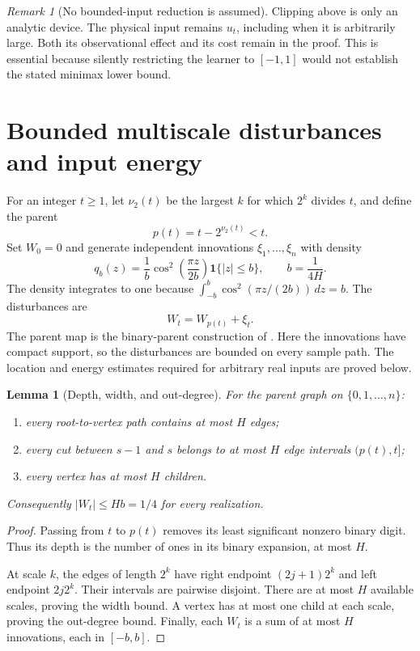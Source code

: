 \documentclass[11pt]{article}
\newtheorem{lemma}[theorem]{Lemma}
\theoremstyle{remark}
\newtheorem{remark}[theorem]{Remark}
\newcommand{\one}{\mathbf 1}
\begin{document}
\begin{remark}[No bounded-input reduction is assumed]
Clipping above is only an analytic device. The physical input remains $u_t$, including when it is arbitrarily large. Both its observational effect and its cost remain in the proof. This is essential because silently restricting the learner to $[-1,1]$ would not establish the stated minimax lower bound.
\end{remark}

\section{Bounded multiscale disturbances and input energy}\label{sec:noise}

For an integer $t\ge1$, let $\nu_2(t)$ be the largest $k$ for which $2^k$ divides $t$, and define the parent
\begin{equation}\label{eq:parent}
 p(t)=t-2^{\nu_2(t)}<t.
\end{equation}
Set $W_0=0$ and generate independent innovations $\xi_1,\ldots,\xi_n$ with density
\begin{equation}\label{eq:density}
 q_b(z)=\frac1b\cos^2\!\left(\frac{\pi z}{2b}\right)\one\{|z|\le b\},
 \qquad b=\frac{1}{4H}.
\end{equation}
The density integrates to one because $\int_{-b}^b\cos^2(\pi z/(2b))\,dz=b$. The disturbances are
\begin{equation}\label{eq:walk}
 W_t=W_{p(t)}+\xi_t.
\end{equation}
The parent map is the binary-parent construction of \citet{dekel}. Here the innovations have compact support, so the disturbances are bounded on every sample path. The location and energy estimates required for arbitrary real inputs are proved below.

\begin{lemma}[Depth, width, and out-degree]\label{lem:tree}
For the parent graph on $\{0,1,\ldots,n\}$:
\begin{enumerate}[label=(\roman*),nosep]
\item every root-to-vertex path contains at most $H$ edges;
\item every cut between $s-1$ and $s$ belongs to at most $H$ edge intervals $(p(t),t]$;
\item every vertex has at most $H$ children.
\end{enumerate}
Consequently $|W_t|\le Hb=1/4$ for every realization.
\end{lemma}
\begin{proof}
Passing from $t$ to $p(t)$ removes its least significant nonzero binary digit. Thus its depth is the number of ones in its binary expansion, at most $H$.

At scale $k$, the edges of length $2^k$ have right endpoint $(2j+1)2^k$ and left endpoint $2j2^k$. Their intervals are pairwise disjoint. There are at most $H$ available scales, proving the width bound. A vertex has at most one child at each scale, proving the out-degree bound. Finally, each $W_t$ is a sum of at most $H$ innovations, each in $[-b,b]$.
\end{proof}
\end{document}
